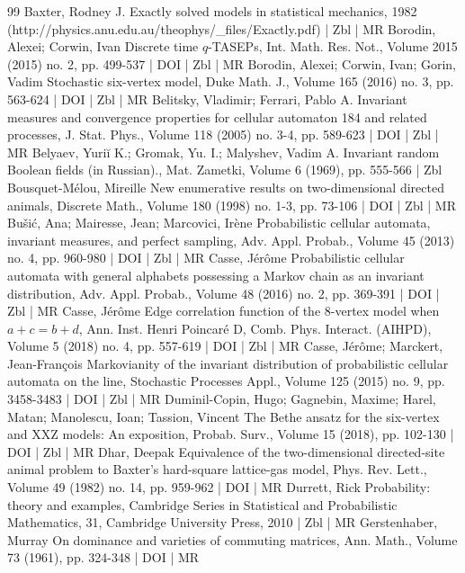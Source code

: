 \begin{thebibliography}{99}
Baxter, Rodney J. Exactly solved models in statistical mechanics, 1982 (http://physics.anu.edu.au/theophys/\_files/Exactly.pdf) | Zbl | MR
Borodin, Alexei; Corwin, Ivan Discrete time $q$-TASEPs, Int. Math. Res. Not., Volume 2015 (2015) no. 2, pp. 499-537 | DOI | Zbl | MR
Borodin, Alexei; Corwin, Ivan; Gorin, Vadim Stochastic six-vertex model, Duke Math. J., Volume 165 (2016) no. 3, pp. 563-624 | DOI | Zbl | MR
Belitsky, Vladimir; Ferrari, Pablo A. Invariant measures and convergence properties for cellular automaton 184 and related processes, J. Stat. Phys., Volume 118 (2005) no. 3-4, pp. 589-623 | DOI | Zbl | MR
Belyaev, Yuriĭ K.; Gromak, Yu. I.; Malyshev, Vadim A. Invariant random Boolean fields (in Russian)., Mat. Zametki, Volume 6 (1969), pp. 555-566 | Zbl
Bousquet-Mélou, Mireille New enumerative results on two-dimensional directed animals, Discrete Math., Volume 180 (1998) no. 1-3, pp. 73-106 | DOI | Zbl | MR
Bušić, Ana; Mairesse, Jean; Marcovici, Irène Probabilistic cellular automata, invariant measures, and perfect sampling, Adv. Appl. Probab., Volume 45 (2013) no. 4, pp. 960-980 | DOI | Zbl | MR
Casse, Jérôme Probabilistic cellular automata with general alphabets possessing a Markov chain as an invariant distribution, Adv. Appl. Probab., Volume 48 (2016) no. 2, pp. 369-391 | DOI | Zbl | MR
Casse, Jérôme Edge correlation function of the 8-vertex model when $ a+ c=b+ d$, Ann. Inst. Henri Poincaré D, Comb. Phys. Interact. (AIHPD), Volume 5 (2018) no. 4, pp. 557-619 | DOI | Zbl | MR
Casse, Jérôme; Marckert, Jean-François Markovianity of the invariant distribution of probabilistic cellular automata on the line, Stochastic Processes Appl., Volume 125 (2015) no. 9, pp. 3458-3483 | DOI | Zbl | MR
Duminil-Copin, Hugo; Gagnebin, Maxime; Harel, Matan; Manolescu, Ioan; Tassion, Vincent The Bethe ansatz for the six-vertex and XXZ models: An exposition, Probab. Surv., Volume 15 (2018), pp. 102-130 | DOI | Zbl | MR
Dhar, Deepak Equivalence of the two-dimensional directed-site animal problem to Baxter’s hard-square lattice-gas model, Phys. Rev. Lett., Volume 49 (1982) no. 14, pp. 959-962 | DOI | MR
Durrett, Rick Probability: theory and examples, Cambridge Series in Statistical and Probabilistic Mathematics, 31, Cambridge University Press, 2010 | Zbl | MR
Gerstenhaber, Murray On dominance and varieties of commuting matrices, Ann. Math., Volume 73 (1961), pp. 324-348 | DOI | MR

\end{thebibliography}
